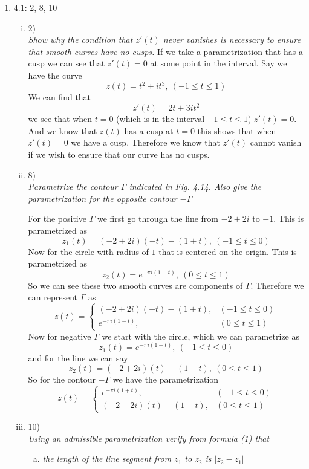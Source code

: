 \documentclass[11pt]{article}
\begin{document}
\begin{enumerate}
\item 4.1:  2, 8, 10
\begin{enumerate}[(i)]
\item 2)\\
\textit{Show why the condition that $z'(t)$ never vanishes is necessary to ensure that smooth curves have no cusps.}
If we take a parametrization that has a cusp we can see that $z'(t)=0$ at some point in the interval. Say we have the curve
$$z(t) = t^2 +it^3,\ (-1\le t\le 1)$$
We can find that 
$$z'(t) = 2t+3it^2$$
we see that when $t=0$ (which is in the interval $-1\le t\le 1$) $z'(t) = 0$. And we know that $z(t)$ has a cusp at $t=0$ this shows that when $z'(t)=0$ we have a cusp. Therefore we know that $z'(t)$ cannot vanish if we wish to ensure that our curve has no cusps.


\item 8)\\
\textit{Parametrize the contour $\Gamma$ indicated in Fig. 4.14. Also give the parametrization for the opposite contour $-\Gamma$}

For the positive $\Gamma$ we first go through the line from $-2+2i$ to $-1$. This is parametrized as
$$z_1(t) = (-2+2i)(-t)-(1+t),\ (-1\le t\le 0)$$
Now for the circle with radius of $1$ that is centered on the origin. This is parametrized as
$$z_2(t) = e^{-\pi i(1-t)},\ (0\le t\le 1)$$
So we can see these two smooth curves are components of $\Gamma$. Therefore we can represent $\Gamma$ as
$$z(t)=\left\{\begin{array}{ll}
	(-2+2i)(-t)-(1+t), &(-1\le t\le 0)\\
	e^{-\pi i(1-t)}, &(0\le t\le 1)
	\end{array}\right.$$
Now for negative $\Gamma$ we start with the circle, which we can parametrize as
$$z_1(t) = e^{-\pi i(1+t)},\ (-1\le t\le 0)$$
and for the line we can say
$$z_2(t) = (-2+2i)(t)-(1-t),\ (0\le t\le 1)$$
So for the contour $-\Gamma$ we have the parametrization
$$z(t)=\left\{\begin{array}{ll}
	e^{-\pi i(1+t)}, &(-1\le t\le 0)\\
 	(-2+2i)(t)-(1-t), &(0\le t\le 1)
	\end{array}\right.$$
	

\item 10)\\
\textit{Using an admissible parametrization verify from formula (1) that}
\begin{enumerate}[(a)]
\item
\textit{the length of the line segment from $z_1$ to $z_2$ is $|z_2-z_1|$}


\end{enumerate}
\end{enumerate}
\end{enumerate}
\end{document}
